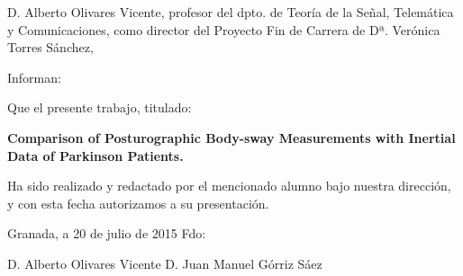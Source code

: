 
\begin{titlepage}
\label{ch:Statement}
\vspace{2cm}

\noindent  D. Alberto Olivares Vicente, profesor  del dpto. de Teoría de la Señal, Telemática y Comunicaciones, como director del Proyecto Fin de Carrera de Dª. Verónica Torres Sánchez,

\vspace{2cm}
\noindent Informan:

\vspace{1.5cm}
\noindent Que el presente trabajo, titulado:

\noindent \textbf{Comparison of Posturographic Body-sway Measurements with Inertial Data of Parkinson Patients.}

\noindent Ha sido realizado y redactado por el mencionado alumno bajo nuestra dirección, y con esta fecha autorizamos a su presentación.
\vspace{3.5cm}

\noindent Granada, a 20 de julio de 2015 Fdo:

\vspace{6.5cm}
\noindent D. Alberto Olivares Vicente    \hfill   D. Juan Manuel Górriz Sáez

\end{titlepage} 